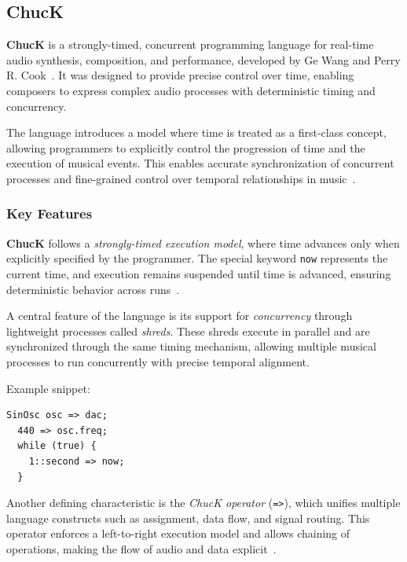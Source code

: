 \subsection{ChucK}\label{subsec:chuck}

\textbf{ChucK} is a strongly-timed, concurrent programming language for real-time audio synthesis, composition, and
performance, developed by Ge Wang and Perry R. Cook~\cite{Wang_Cook_2003}.
It was designed to provide precise control over time, enabling composers to express complex audio processes with
deterministic timing and concurrency.

The language introduces a model where time is treated as a first-class concept, allowing programmers to explicitly
control the progression of time and the execution of musical events.
This enables accurate synchronization of concurrent processes and fine-grained control over temporal relationships in
music~\cite{Wang_Cook_2003}.


\subsubsection{Key Features}

\textbf{ChucK} follows a \textit{strongly-timed execution model}, where time advances only when explicitly specified by
the programmer.
The special keyword \texttt{now} represents the current time, and execution remains suspended until time is advanced,
ensuring deterministic behavior across runs~\cite{Wang_Cook_2003}.

A central feature of the language is its support for \textit{concurrency} through lightweight processes called
\textit{shreds}.
These shreds execute in parallel and are synchronized through the same timing mechanism, allowing multiple musical
processes to run concurrently with precise temporal alignment.

Example snippet:

\begin{lstlisting}[label={lst:chuck-1}]
  SinOsc osc => dac;
  440 => osc.freq;
  while (true) {
    1::second => now;
  }
\end{lstlisting}

Another defining characteristic is the \textit{ChucK operator} (\texttt{=>}), which unifies multiple language constructs
such as assignment, data flow, and signal routing.
This operator enforces a left-to-right execution model and allows chaining of operations, making the flow of audio and
data explicit~\cite{Wang_Cook_2003}.

